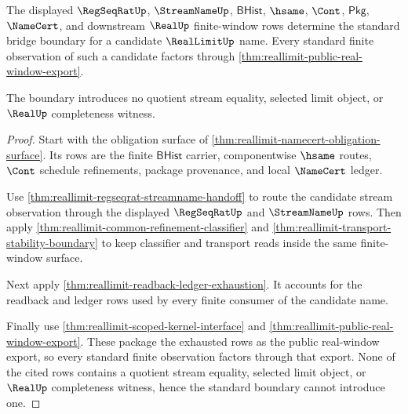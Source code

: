 \begin{theorem}
\label{thm:reallimit-standard-bridge-boundary}
The displayed $\RegSeqRatUp$, $\StreamNameUp$, $\mathsf{BHist}$, $\hsame$,
$\Cont$, $\mathsf{Pkg}$, $\NameCert$, and downstream $\RealUp$ finite-window
rows determine the standard bridge boundary for a candidate $\RealLimitUp$
name. Every standard finite observation of such a candidate factors through
\autoref{thm:reallimit-public-real-window-export}.

The boundary introduces no quotient stream equality, selected limit object, or
$\RealUp$ completeness witness.
\end{theorem}
\begin{proof}
Start with the obligation surface of
\autoref{thm:reallimit-namecert-obligation-surface}. Its rows are the
finite $\mathsf{BHist}$ carrier, componentwise $\hsame$ routes, $\Cont$
schedule refinements, package provenance, and local $\NameCert$ ledger.

Use \autoref{thm:reallimit-regseqrat-streamname-handoff} to route the
candidate stream observation through the displayed $\RegSeqRatUp$ and
$\StreamNameUp$ rows. Then apply
\autoref{thm:reallimit-common-refinement-classifier} and
\autoref{thm:reallimit-transport-stability-boundary} to keep classifier and
transport reads inside the same finite-window surface.

Next apply \autoref{thm:reallimit-readback-ledger-exhaustion}. It accounts for
the readback and ledger rows used by every finite consumer of the candidate
name.

Finally use \autoref{thm:reallimit-scoped-kernel-interface} and
\autoref{thm:reallimit-public-real-window-export}. These package the exhausted
rows as the public real-window export, so every standard finite observation
factors through that export. None of the cited rows contains a quotient stream
equality, selected limit object, or $\RealUp$ completeness witness, hence the
standard boundary cannot introduce one.
\end{proof}

